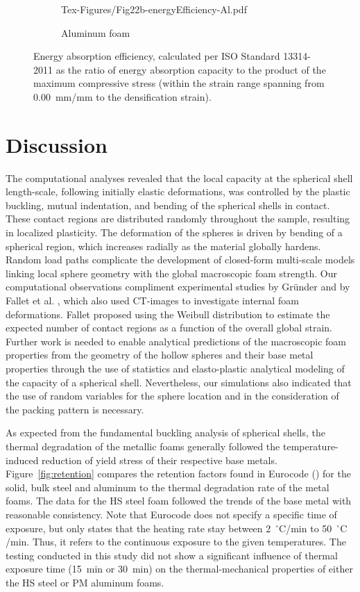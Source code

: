 \documentclass[review]{elsarticle}
\begin{document}
\begin{figure}
\begin{subfigure}{0.50\textwidth}
		{Tex-Figures/Fig22b-energyEfficiency-Al.pdf}
		\caption{Aluminum foam}
		\label{fig:energyEfficiency_Al}
	\end{subfigure}
	\caption{Energy absorption efficiency, calculated per ISO Standard 13314-2011 as the ratio of energy absorption capacity to the product of the maximum compressive stress (within the strain range spanning from 0.00~mm/mm to the densification strain).}
	\label{fig:energyEfficiency}
\end{figure}

\section{Discussion}

The computational analyses revealed that the local capacity at the spherical shell length-scale, following initially elastic deformations, was controlled by the plastic buckling, mutual indentation, and bending of the spherical shells in contact. These contact regions are distributed randomly throughout the sample, resulting in localized plasticity. The deformation of the spheres is driven by bending of a spherical region, which increases radially as the material globally hardens. Random load paths complicate the development of closed-form multi-scale models linking local sphere geometry with the global macroscopic foam strength. Our computational observations compliment experimental studies by Gr\"{u}nder \cite{grunder_modeling_2001} and by Fallet et al. \cite{Fallet2008}, which also used CT-images to investigate internal foam deformations. Fallet proposed using the Weibull distribution to estimate the expected number of contact regions as a function of the overall global strain. Further work is needed to enable analytical predictions of the macroscopic foam properties from the geometry of the hollow spheres and their base metal properties through the use of statistics and elasto-plastic analytical modeling of the capacity of a spherical shell. Nevertheless, our simulations also indicated that the use of random variables for the sphere location and in the consideration of the packing pattern is necessary.

As expected from the fundamental buckling analysis of spherical shells, the thermal degradation of the metallic foams generally followed the temperature-induced reduction of yield stress of their respective base metals. Figure~\ref{fig:retention} compares the retention factors found in Eurocode (\cite{EC3-1-2}) for the solid, bulk steel and aluminum to the thermal degradation rate of the metal foams. The data for the HS steel foam followed the trends of the base metal with reasonable consistency. Note that Eurocode does not specify a specific time of exposure, but only states that the heating rate stay between 2~$^\circ\mathrm{C}$/min to 50~$^\circ\mathrm{C}$/min. Thus, it refers to the continuous exposure to the given temperatures. The testing conducted in this study did not show a significant influence of thermal exposure time (15~min or 30~min) on the thermal-mechanical properties of either the HS steel or PM aluminum foams.
\end{document}
